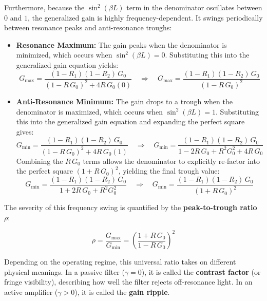 Furthermore, because the $\sin^2(\beta L)$ term in the denominator oscillates between $0$ and $1$, the generalized gain is highly frequency-dependent. It swings periodically between resonance peaks and anti-resonance troughs:
\begin{itemize}
    \item \textbf{Resonance Maximum:} The gain peaks when the denominator is minimized, which occurs when $\sin^2(\beta L) = 0$. Substituting this into the generalized gain equation yields:
          \begin{equation*}
              G_{\max} = \frac{(1-R_1)(1-R_2)\,G_0}{(1 - R\,G_0)^2 + 4R\,G_0(0)} \quad \Rightarrow \quad G_{\max} = \frac{(1-R_1)(1-R_2)\,G_0}{(1 - R\,G_0)^2}
          \end{equation*}

    \item \textbf{Anti-Resonance Minimum:} The gain drops to a trough when the denominator is maximized, which occurs when $\sin^2(\beta L) = 1$. Substituting this into the generalized gain equation and expanding the perfect square gives:
          \begin{equation*}
              G_{\min} = \frac{(1-R_1)(1-R_2)\,G_0}{(1 - R\,G_0)^2 + 4R\,G_0(1)} \quad \Rightarrow \quad G_{\min} = \frac{(1-R_1)(1-R_2)\,G_0}{1 - 2R\,G_0 + R^2 G_0^2 + 4R\,G_0}
          \end{equation*}
          Combining the $R\,G_0$ terms allows the denominator to explicitly re-factor into the perfect square $(1+R\,G_0)^2$, yielding the final trough value:
          \begin{equation*}
              G_{\min} = \frac{(1-R_1)(1-R_2)\,G_0}{1 + 2R\,G_0 + R^2 G_0^2} \quad \Rightarrow \quad G_{\min} = \frac{(1-R_1)(1-R_2)\,G_0}{(1 + R\,G_0)^2}
          \end{equation*}
\end{itemize}

The severity of this frequency swing is quantified by the \textbf{peak-to-trough ratio} $\rho$:
\begin{keyresult}
    \begin{equation}
        \rho = \frac{G_{\max}}{G_{\min}}
        = \left(\frac{1 + R\,G_0}{1 - R\,G_0}\right)^{\!2}
    \end{equation}
\end{keyresult}
Depending on the operating regime, this universal ratio takes on different physical meanings. In a passive filter ($\gamma = 0$), it is called the \textbf{contrast factor} (or fringe visibility), describing how well the filter rejects off-resonance light. In an active amplifier ($\gamma > 0$), it is called the \textbf{gain ripple}.

